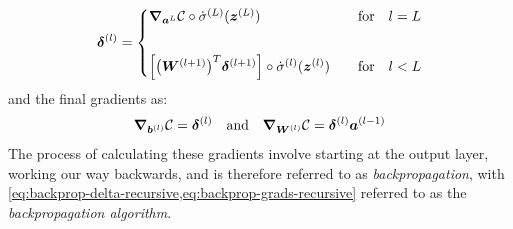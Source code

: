 \documentclass[Thesis.tex]{subfiles}
\begin{document}
\begin{align}
  \label{eq:backprop-delta-recursive}
  \vb{\delta}^{(l)} =
                      \begin{cases}
                        \grad_{\vb{a}^{L}}{\mathcal{C}}\circ
                        \dot\sigma^{(L)}(\vb{z}^{(L)}) &\qfor l = L\\[20pt]
                        \qty[\qty(\mat{W}^{(l+1)})^T \vb{\delta}^{(l+1)}]\circ
                            \dot\sigma^{(l)}(\vb{z}^{(l)})&\qfor l < L
                      \end{cases}
\end{align}
and the final gradients as:
\begin{align}
  \label{eq:backprop-grads-recursive}
  \grad_{\vb{b}^{(l)}}{\mathcal{C}} = \vb{\delta}^{(l)}
  \qand \grad_{\mat{W}^{(l)}}{\mathcal{C}} = \vb{\delta}^{(l)}\vb{a}^{(l-1)}
\end{align}
The process of calculating these gradients involve starting at the output layer,
working our way backwards, and is therefore referred to as
\emph{backpropagation}, with
\cref{eq:backprop-delta-recursive,eq:backprop-grads-recursive} referred to as
the \emph{backpropagation algorithm}.
\end{document}
